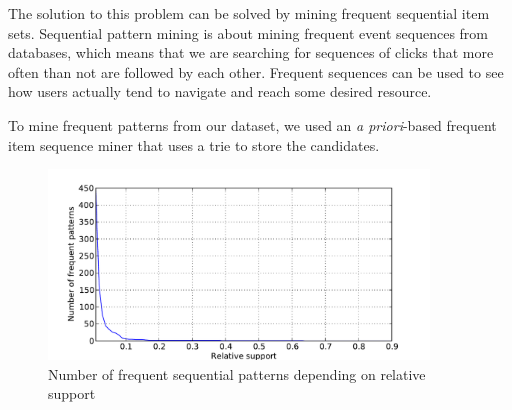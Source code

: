 \documentclass[12pt, english,a4paper]{article}
\begin{document}
The solution to this problem can be solved by mining frequent sequential item sets. Sequential pattern mining is about mining frequent event sequences from databases, which means that we are searching for sequences of clicks that more often than not are followed by each other. Frequent sequences can be used to see how users actually tend to navigate and reach some desired resource.

To mine frequent patterns from our dataset, we used an \emph{a priori}-based frequent item sequence miner that uses a trie to store the candidates\cite{seq_apriori}.

\begin{figure}[H]
  \centering
      \includegraphics[width=0.9\textwidth]{sequential_itemset_count}
  \caption{Number of frequent sequential patterns depending on relative support}
\end{figure}
\end{document}
